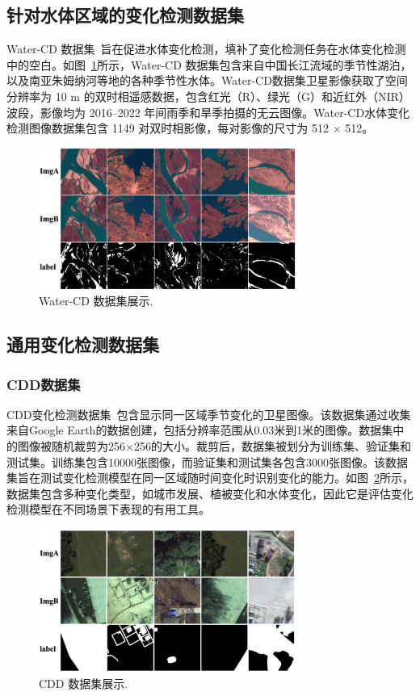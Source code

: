 \subsection{针对水体区域的变化检测数据集}
Water-CD 数据集~\cite{j_li_trsanet_2024}旨在促进水体变化检测，填补了变化检测任务在水体变化检测中的空白。如图~\ref{fig:watercd}所示，Water-CD 数据集包含来自中国长江流域的季节性湖泊，以及南亚朱姆纳河等地的各种季节性水体。Water-CD数据集卫星影像获取了空间分辨率为 10 m 的双时相遥感数据，包含红光（R）、绿光（G）和近红外（NIR）波段，影像均为 2016–2022 年间雨季和旱季拍摄的无云图像。Water-CD水体变化检测图像数据集包含 1149 对双时相影像，每对影像的尺寸为 512 × 512。

\begin{figure}[!htb]
  \centering
  \includegraphics[width=0.75\textwidth]{paper_figures/变化检测任务与实验方法介绍/watercd.png}
  \caption{Water-CD 数据集展示.}
  \label{fig:watercd}
\end{figure}

\subsection{通用变化检测数据集}
\subsubsection{CDD数据集}
CDD变化检测数据集~\cite{Lebedev2018CHANGEDI}包含显示同一区域季节变化的卫星图像。该数据集通过收集来自Google Earth的数据创建，包括分辨率范围从0.03米到1米的图像。数据集中的图像被随机裁剪为256×256的大小。裁剪后，数据集被划分为训练集、验证集和测试集。训练集包含10000张图像，而验证集和测试集各包含3000张图像。该数据集旨在测试变化检测模型在同一区域随时间变化时识别变化的能力。如图~\ref{fig:cdd}所示，数据集包含多种变化类型，如城市发展、植被变化和水体变化，因此它是评估变化检测模型在不同场景下表现的有用工具。

\begin{figure}[!htb]
  \centering
  \includegraphics[width=0.75\textwidth]{paper_figures/变化检测任务与实验方法介绍/cdd.png}
  \caption{CDD 数据集展示.}
  \label{fig:cdd}
\end{figure}

